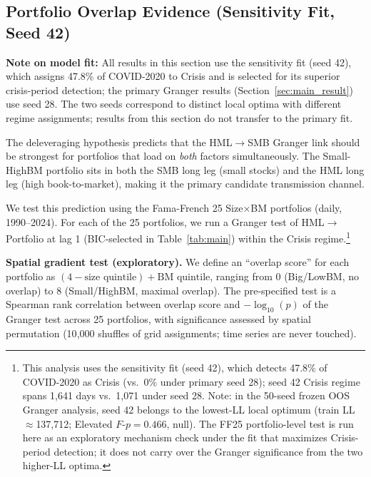 \documentclass[sigconf,anonymous]{acmart}
\begin{document}
\subsection{Portfolio Overlap Evidence (Sensitivity Fit, Seed 42)}
\label{sec:overlap_evidence}

\textbf{Note on model fit:} All results in this section use the sensitivity fit
(seed 42), which assigns 47.8\% of COVID-2020 to Crisis and is selected for its
superior crisis-period detection; the primary Granger results (Section~\ref{sec:main_result})
use seed 28. The two seeds correspond to distinct local optima with different
regime assignments; results from this section do not transfer to the primary fit.

The deleveraging hypothesis predicts that the HML$\to$SMB Granger link should
be strongest for portfolios that load on \emph{both} factors simultaneously.
The Small-HighBM portfolio sits in both the SMB long leg (small stocks) and
the HML long leg (high book-to-market), making it the primary candidate
transmission channel.

We test this prediction using the Fama-French 25 Size$\times$BM portfolios
(daily, 1990--2024). For each of the 25 portfolios, we run a Granger test
of HML$\to$Portfolio at lag 1 (BIC-selected in Table~\ref{tab:main}) within
the Crisis regime.\footnote{This analysis uses the sensitivity fit (seed 42),
which detects 47.8\% of COVID-2020 as Crisis (vs.\ 0\% under primary seed 28);
seed 42 Crisis regime spans 1,641 days vs.\ 1,071 under seed 28.
Note: in the 50-seed frozen OOS Granger analysis, seed 42 belongs to the
lowest-LL local optimum (train LL$\approx$137,712; Elevated $F$-$p = 0.466$, null).
The FF25 portfolio-level test is run here as an exploratory mechanism check
under the fit that maximizes Crisis-period detection; it does not carry over
the Granger significance from the two higher-LL optima.}

\textbf{Spatial gradient test (exploratory).} We define an ``overlap score'' for each
portfolio as $(4 - \text{size quintile}) + \text{BM quintile}$, ranging from
0 (Big/LowBM, no overlap) to 8 (Small/HighBM, maximal overlap). The
pre-specified test is a Spearman rank correlation between overlap score and
$-\log_{10}(p)$ of the Granger test across 25 portfolios, with significance
assessed by spatial permutation (10{,}000 shuffles of grid assignments;
time series are never touched).
\end{document}
